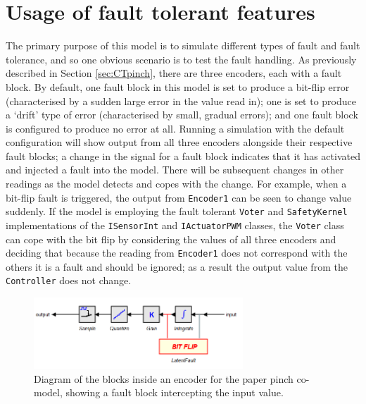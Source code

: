\section{Usage of fault tolerant features} The primary purpose of this model is to
simulate different types of fault and fault tolerance, and so one
obvious scenario is to test the fault handling.  As previously
described in Section \ref{sec:CTpinch}, there are three encoders, each
with a fault block.  By default, one fault block in this model is set
to produce a bit-flip error (characterised by a sudden large error in
the value read in); one is set to produce a `drift' type of error
(characterised by small, gradual errors); and one fault block is
configured to produce no error at all.  Running a simulation with the
default configuration will show output from all three encoders
alongside their respective fault blocks; a change in the signal for a
fault block indicates that it has activated and injected a fault into
the model.  There will be subsequent changes in other readings as the
model detects and copes with the change.  For example, when a bit-flip
fault is triggered, the output from \texttt{Encoder1} can be seen to
change value suddenly. If the model is employing the fault tolerant
\texttt{Voter} and \texttt{SafetyKernel} implementations of the
\texttt{ISensorInt} and \texttt{IActuatorPWM} classes, the
\texttt{Voter} class can cope with the bit flip by considering the
values of all three encoders and deciding that because the reading
from \texttt{Encoder1} does not correspond with the others it is a
fault and should be ignored; as a result the output value from the
\texttt{Controller} does not change.

\begin{figure}[!ht] \centering
\includegraphics[width=0.7\textwidth]{pidPinch/pidPinchFaultBlock.png}
\caption{Diagram of the blocks inside an encoder for the paper pinch
  co-model, showing a fault block intercepting the input value.}
\label{fig:paperPinchFaultBlock}
\end{figure}

